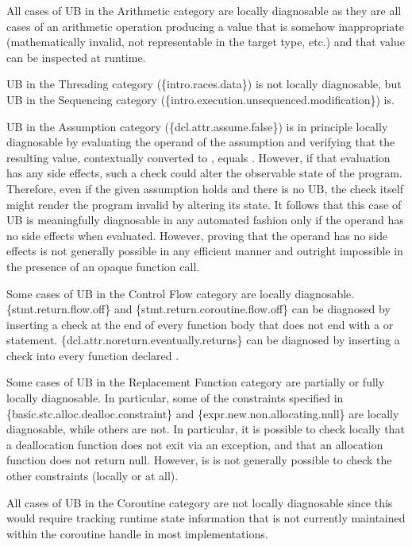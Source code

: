 All cases of UB in the Arithmetic category are locally diagnosable as they are all cases of an arithmetic operation producing a value that is somehow inappropriate (mathematically invalid, not representable in the target type, etc.) and that value can be inspected at runtime.

UB in the Threading category (\{intro.races.data\}) is not locally diagnosable, but UB in the Sequencing category (\{intro.execution.unsequenced.modification\}) is. 

UB in the Assumption category (\{dcl.attr.assume.false\}) is in principle locally diagnosable by evaluating the operand of the assumption and verifying that the resulting value, contextually converted to , equals . However, if that evaluation has any side effects, such a check could alter the observable state of the program. Therefore, even if the given assumption holds and there is no UB, the check itself might render the program invalid by altering its state. It follows that this case of UB is  meaningfully diagnosable in any automated fashion only if the operand has no side effects when evaluated. However, proving that the operand has no side effects is not generally possible in any efficient manner and outright impossible in the presence of an opaque function call.

Some cases of UB in the Control Flow category are locally diagnosable. \{stmt.return.flow.off\} and \{stmt.return.coroutine.flow.off\} can be diagnosed by inserting a check at the end of every function body that does not end with a  or  statement. \{dcl.attr.noreturn.eventually.returns\} can be diagnosed by inserting a check into every function declared \tcode{[[noreturn]]}.

Some cases of UB in the Replacement Function category are partially or fully locally diagnosable. In particular, some of the constraints specified in \{basic.stc.alloc.dealloc.constraint\} and \{expr.new.non.allocating.null\} are locally diagnosable, while others are not. In particular, it is possible to check locally that a deallocation function does not exit via an exception, and that an allocation function does not return null. However, is is not generally possible to check the other constraints (locally or at all).

All cases of UB in the Coroutine category are not locally diagnosable since this would require tracking runtime state information that is not currently maintained within the coroutine handle in most implementations.

